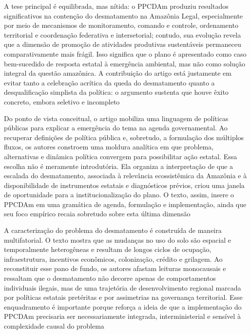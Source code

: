 \documentclass[12pt,a4paper]{article}
\begin{document}
A tese principal é equilibrada, mas nítida: o PPCDAm produziu resultados significativos na contenção do desmatamento na Amazônia Legal, especialmente por meio de mecanismos de monitoramento, comando e controle, ordenamento territorial e coordenação federativa e intersetorial; contudo, sua evolução revela que a dimensão de promoção de atividades produtivas sustentáveis permaneceu comparativamente mais frágil. Isso significa que o plano é apresentado como caso bem-sucedido de resposta estatal à emergência ambiental, mas não como solução integral da questão amazônica. A contribuição do artigo está justamente em evitar tanto a celebração acrítica da queda do desmatamento quanto a desqualificação simplista da política: o argumento sustenta que houve êxito concreto, embora seletivo e incompleto \parencite{mello2017_evolucao_plano}

Do ponto de vista conceitual, o artigo mobiliza uma linguagem de políticas públicas para explicar a emergência do tema na agenda governamental. Ao recuperar definições de política pública e, sobretudo, a formulação dos múltiplos fluxos, os autores constroem uma moldura analítica em que problema, alternativas e dinâmica política convergem para possibilitar ação estatal. Essa escolha não é meramente introdutória. Ela organiza a interpretação de que a escalada do desmatamento, associada à relevância ecossistêmica da Amazônia e à disponibilidade de instrumentos estatais e diagnósticos prévios, criou uma janela de oportunidade para a institucionalização do plano. O texto, assim, insere o PPCDAm em uma gramática de agenda, formulação e implementação, ainda que seu foco empírico recaia sobretudo sobre esta última dimensão \parencite{mello2017_evolucao_plano}

A caracterização do problema do desmatamento é construída de maneira multifatorial. O texto mostra que as mudanças no uso do solo são espacial e temporalmente heterogêneas e resultam de longos ciclos de ocupação, infraestrutura, incentivos econômicos, colonização, crédito e grilagem. Ao reconstituir esse pano de fundo, os autores afastam leituras monocausais e ressaltam que o desmatamento não decorre apenas de comportamentos individuais ilegais, mas de uma trajetória de desenvolvimento regional marcada por políticas estatais pretéritas e por assimetrias na governança territorial. Esse enquadramento é importante porque reforça a ideia de que a implementação do PPCDAm precisaria ser necessariamente integrada, interministerial e sensível à complexidade causal do problema \parencite{mello2017_evolucao_plano}
\end{document}

